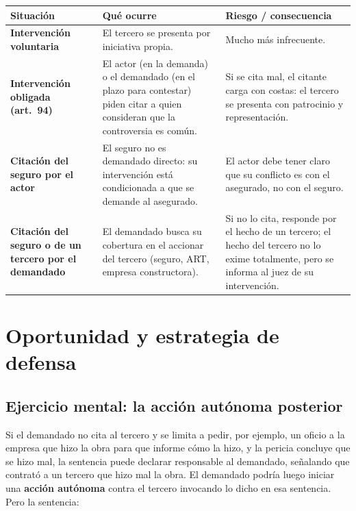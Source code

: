 \documentclass[12pt,oneside]{book}
\begin{document}
\begin{table}[H]
\centering
\small
\begin{tabularx}{\textwidth}{>{\raggedright\arraybackslash}p{}>{\raggedright\arraybackslash}X>{\raggedright\arraybackslash}X}
\toprule
\textbf{Situaci\'on} & \textbf{Qu\'e ocurre} & \textbf{Riesgo / consecuencia} \\
\midrule
\textbf{Intervenci\'on voluntaria} & El tercero se presenta por iniciativa propia. & Mucho m\'as infrecuente. \\
\addlinespace
\textbf{Intervenci\'on obligada (art.~94)} & El actor (en la demanda) o el demandado (en el plazo para contestar) piden citar a quien consideran que la controversia es com\'un. & Si se cita mal, el citante carga con costas: el tercero se presenta con patrocinio y representaci\'on. \\
\addlinespace
\textbf{Citaci\'on del seguro por el actor} & El seguro no es demandado directo: su intervenci\'on est\'a condicionada a que se demande al asegurado. & El actor debe tener claro que su conflicto es con el asegurado, no con el seguro. \\
\addlinespace
\textbf{Citaci\'on del seguro o de un tercero por el demandado} & El demandado busca su cobertura en el accionar del tercero (seguro, ART, empresa constructora). & Si no lo cita, responde por el hecho de un tercero; el hecho del tercero no lo exime totalmente, pero se informa al juez de su intervenci\'on. \\
\bottomrule
\end{tabularx}
\end{table}

\section{Oportunidad y estrategia de defensa}

\subsection{Ejercicio mental: la acci\'on aut\'onoma posterior}

Si el demandado no cita al tercero y se limita a pedir, por ejemplo, un oficio a la empresa que hizo la obra para que informe c\'omo la hizo, y la pericia concluye que se hizo mal, la sentencia puede declarar responsable al demandado, se\~nalando que contrat\'o a un tercero que hizo mal la obra. El demandado podr\'ia luego iniciar una \textbf{acci\'on aut\'onoma} contra el tercero invocando lo dicho en esa sentencia. Pero la sentencia:
\end{document}
